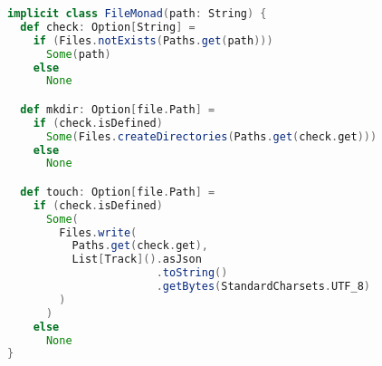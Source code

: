 \begin{lstlisting}[language=Scala, caption=Monade per le operazioni di setup, label=lst:setup]
implicit class FileMonad(path: String) {
  def check: Option[String] =
    if (Files.notExists(Paths.get(path)))
      Some(path)
    else
      None

  def mkdir: Option[file.Path] =
    if (check.isDefined)
      Some(Files.createDirectories(Paths.get(check.get)))
    else
      None

  def touch: Option[file.Path] =
    if (check.isDefined)
      Some(
        Files.write(
          Paths.get(check.get),
          List[Track]().asJson
                       .toString()
                       .getBytes(StandardCharsets.UTF_8)
        )
      )
    else
      None
}
\end{lstlisting}